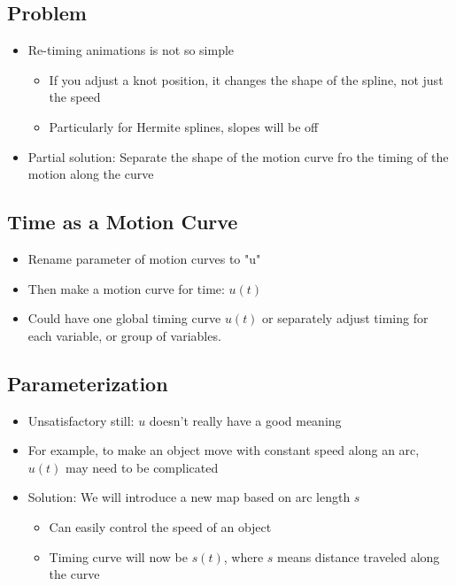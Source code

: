 \documentclass{article}
\begin{document}
\subsection*{Problem}
\begin{itemize}
    \item Re-timing animations is not so simple
    \begin{itemize}
        \item If you adjust a knot position, it changes the shape of the spline, not just the speed
        \item Particularly for Hermite splines, slopes will be off
    \end{itemize}
    \item Partial solution: Separate the shape of the motion curve fro the timing of the motion along the curve
\end{itemize}

\subsection*{Time as a Motion Curve}
\begin{itemize}
    \item Rename parameter of motion curves to "u"
    \item Then make a motion curve for time: $u(t)$
    \item Could have one global timing curve $u(t)$ or separately adjust timing for each variable, or group of variables.
\end{itemize}

\subsection*{Parameterization}
\begin{itemize}
    \item Unsatisfactory still: $u$ doesn't really have a good meaning
    \item For example, to make an object move with constant speed along an arc, $u(t)$ may need to be complicated
    \item Solution: We will introduce a new map based on arc length $s$
    \begin{itemize}
        \item Can easily control the speed of an object\
        \item Timing curve will now be $s(t)$, where $s$ means distance traveled along the curve
    \end{itemize}
\end{itemize}
\end{document}
